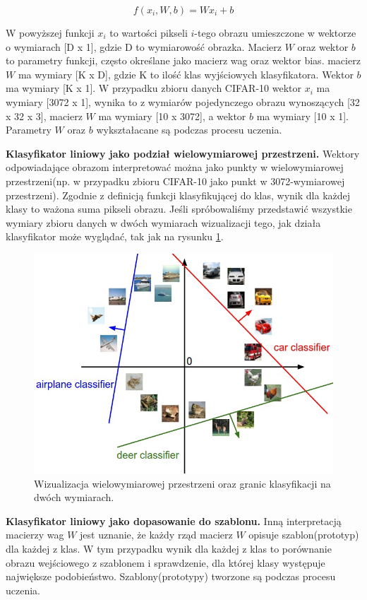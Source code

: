 \documentclass[a4paper,11pt, notitlepage, twosides, openany ]{report}
\begin{document}
	$$
		f(x_i, W, b) = Wx_i + b
	$$

	W powyższej funkcji $x_i$ to wartości pikseli $i$-tego obrazu umieszczone w wektorze o wymiarach [D x 1], gdzie D to wymiarowość obrazka. Macierz $W$ oraz wektor $b$ to parametry funkcji, często określane jako macierz wag oraz wektor bias. macierz $W$ ma wymiary [K x D], gdzie K to ilość klas wyjściowych klasyfikatora. Wektor $b$ ma wymiary [K x 1]. W przypadku zbioru danych CIFAR-10 wektor $x_i$ ma wymiary [3072 x 1], wynika to z wymiarów pojedynczego obrazu wynoszących [32 x 32 x 3], macierz $W$ ma wymiary [10 x 3072], a wektor $b$ ma wymiary [10 x 1]. Parametry $W$ oraz $b$ wykształacane są podczas procesu uczenia.

	\textbf{Klasyfikator liniowy jako podział wielowymiarowej przestrzeni.} Wektory odpowiadające obrazom interpretować można jako punkty w wielowymiarowej przestrzeni(np. w przypadku zbioru CIFAR-10 jako punkt w 3072-wymiarowej przestrzeni). Zgodnie z definicją funkcji klasyfikującej do klas, wynik dla każdej klasy to ważona suma pikseli obrazu. Jeśli spróbowaliśmy przedstawić wszystkie wymiary zbioru danych w dwóch wymiarach wizualizacji tego, jak działa klasyfikator może wyglądać, tak jak na rysunku \ref{linear-clas}.

	\begin{figure}[h]
		\centering
		\includegraphics[width=0.9 \textwidth]{lin-clas.jpeg}
		\caption{Wizualizacja wielowymiarowej przestrzeni oraz granic klasyfikacji na dwóch wymiarach.}
		\label{linear-clas}
	\end{figure}

	\textbf{Klasyfikator liniowy jako dopasowanie do szablonu.} Inną interpretacją macierzy wag $W$ jest uznanie, że każdy rząd macierz $W$ opisuje szablon(prototyp) dla każdej z klas. W tym przypadku wynik dla każdej z klas to porównanie obrazu wejściowego z szablonem i sprawdzenie, dla której klasy występuje największe podobieństwo. Szablony(prototypy) tworzone są podczas procesu uczenia. 
\end{document}
